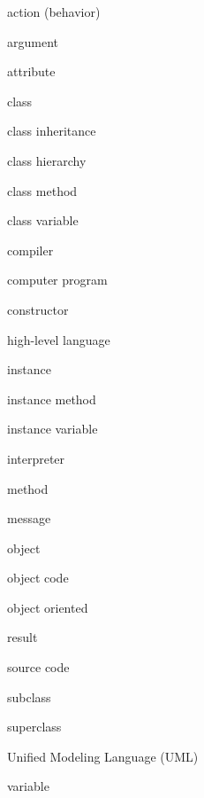 %
%
\begin{KT}
action (behavior)

argument

attribute

class

class inheritance

class hierarchy 

class method

class variable

compiler

computer program

constructor

high\mbox{-}level language

instance

instance method

instance variable

interpreter

method

message

object

object code

object oriented

result

source code

subclass

superclass

Unified Modeling Language (UML)

variable
\end{KT}



